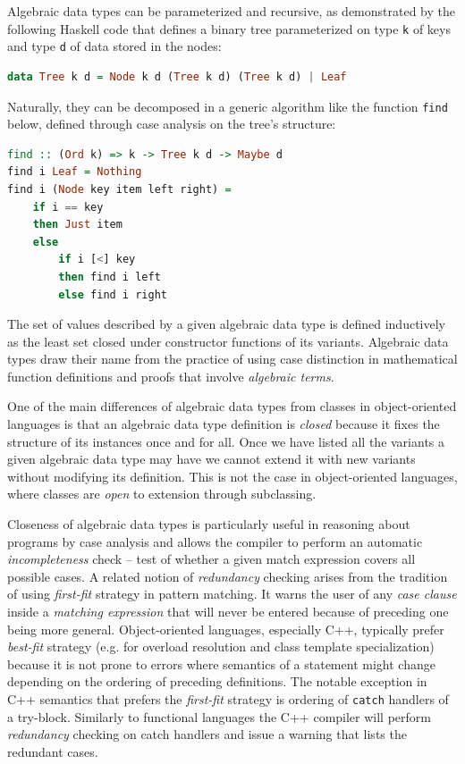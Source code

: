 \documentclass[preprint]{sigplanconf}
\makeatletter
\DeclareRobustCommand{\code}[1]{{\lstinline[breaklines=false,escapechar=@]{#1}}}
\DeclareRobustCommand{\codehaskell}[1]{{\lstinline[breaklines=false,language=Haskell]{#1}}}
\makeatother
\begin{document}
Algebraic data types can be parameterized and recursive, as demonstrated by the 
following Haskell code that defines a binary tree parameterized on type 
\codehaskell{k} of keys and type \codehaskell{d} of data stored in the nodes:

\begin{lstlisting}[language=Haskell]
data Tree k d = Node k d (Tree k d) (Tree k d) | Leaf
\end{lstlisting}

Naturally, they can be decomposed in a generic algorithm like the function 
\code{find} below, defined through case analysis on the tree's structure:

\begin{lstlisting}[language=Haskell]
find :: (Ord k) => k -> Tree k d -> Maybe d
find i Leaf = Nothing
find i (Node key item left right) = 
    if i == key 
    then Just item 
    else 
        if i [<] key 
        then find i left 
        else find i right
\end{lstlisting}

The set of values described by a given algebraic data type is defined 
inductively as the least set closed under constructor functions of its variants.
Algebraic data types draw their name from the practice of using case distinction 
in mathematical function definitions and proofs that involve \emph{algebraic 
terms}.

One of the main differences of algebraic data types from classes in 
object-oriented languages is that an algebraic data type definition is 
\emph{closed} because it fixes the structure of its instances once and for all. 
Once we have listed all the variants a given algebraic data type may have we 
cannot extend it with new variants without modifying its definition. This is not 
the case in object-oriented languages, where classes are \emph{open} to 
extension through subclassing. 

Closeness of algebraic data types is particularly useful in reasoning about 
programs by case analysis and allows the compiler to perform an automatic 
\emph{incompleteness} check -- test of whether a given match expression covers all 
possible cases. A related notion of \emph{redundancy} checking arises from the 
tradition of using \emph{first-fit} strategy in pattern matching. It warns the 
user of any \emph{case clause} inside a \emph{matching expression} that will 
never be entered because of preceding one being more general. Object-oriented 
languages, especially C++, typically prefer \emph{best-fit} strategy (e.g. for 
overload resolution and class template specialization) because it is not prone 
to errors where semantics of a statement might change depending on the ordering 
of preceding definitions. The notable exception in C++ semantics that prefers 
the \emph{first-fit} strategy is ordering of \code{catch} handlers of a 
try-block. Similarly to functional languages the C++ compiler will perform 
\emph{redundancy} checking on catch handlers and issue a warning that lists the 
redundant cases.
\end{document}
